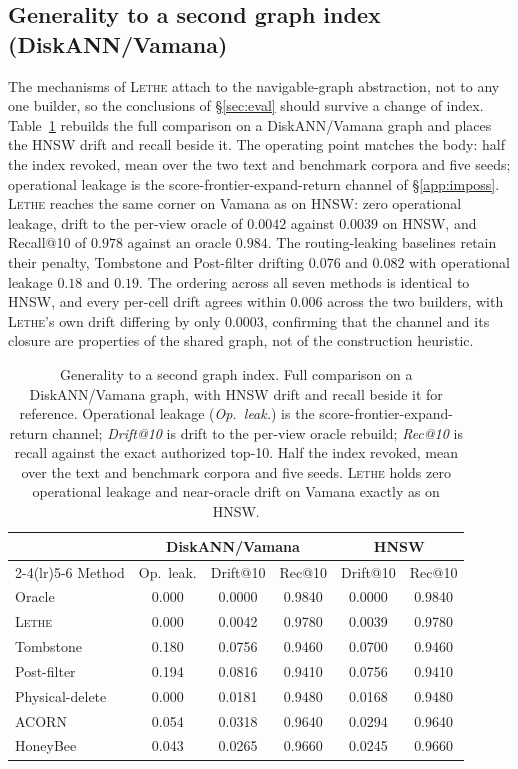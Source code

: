 \documentclass[sigconf, nonacm, review]{acmart}
\begin{document}
\subsection{Generality to a second graph index (DiskANN/Vamana)}
\label{app:diskann}
The mechanisms of \textsc{Lethe} attach to the navigable-graph abstraction, not
to any one builder, so the conclusions of \S\ref{sec:eval} should survive a
change of index. Table~\ref{tab:diskann} rebuilds the full comparison on a
DiskANN/Vamana graph and places the HNSW drift and recall beside it. The
operating point matches the body: half the index revoked, mean over the two
text and benchmark corpora and five seeds; operational leakage is the
score-frontier-expand-return channel of \S\ref{app:imposs}. \textsc{Lethe}
reaches the same corner on Vamana as on HNSW: zero operational leakage, drift to
the per-view oracle of $0.0042$ against $0.0039$ on HNSW, and Recall@10 of
$0.978$ against an oracle $0.984$. The routing-leaking baselines retain their
penalty, Tombstone and Post-filter drifting $0.076$ and $0.082$ with operational
leakage $0.18$ and $0.19$. The ordering across all seven methods is identical to
HNSW, and every per-cell drift agrees within $0.006$ across the two builders,
with \textsc{Lethe}'s own drift differing by only $0.0003$, confirming that the
channel and its closure are properties of the shared graph, not of the
construction heuristic.

\begin{table}[t]
\centering
\caption{Generality to a second graph index. Full comparison on a
DiskANN/Vamana graph, with HNSW drift and recall beside it for reference.
Operational leakage (\emph{Op.\ leak.}) is the score-frontier-expand-return
channel; \emph{Drift@10} is drift to the per-view oracle rebuild; \emph{Rec@10}
is recall against the exact authorized top-10. Half the index revoked, mean over
the text and benchmark corpora and five seeds. \textsc{Lethe} holds zero
operational leakage and near-oracle drift on Vamana exactly as on HNSW.}
\label{tab:diskann}
\small
\setlength{\tabcolsep}{4pt}
\begin{tabular}{@{}lccc cc@{}}
\toprule
& \multicolumn{3}{c}{DiskANN/Vamana} & \multicolumn{2}{c}{HNSW} \\
\cmidrule(lr){2-4}\cmidrule(lr){5-6}
Method & Op.\ leak. & Drift@10 & Rec@10 & Drift@10 & Rec@10 \\
\midrule
Oracle & 0.000 & 0.0000 & 0.9840 & 0.0000 & 0.9840 \\
\rowcolor{letherow}\textsc{Lethe} & 0.000 & 0.0042 & 0.9780 & 0.0039 & 0.9780 \\
Tombstone & 0.180 & 0.0756 & 0.9460 & 0.0700 & 0.9460 \\
Post-filter & 0.194 & 0.0816 & 0.9410 & 0.0756 & 0.9410 \\
Physical-delete & 0.000 & 0.0181 & 0.9480 & 0.0168 & 0.9480 \\
ACORN & 0.054 & 0.0318 & 0.9640 & 0.0294 & 0.9640 \\
HoneyBee & 0.043 & 0.0265 & 0.9660 & 0.0245 & 0.9660 \\
\bottomrule
\end{tabular}
\end{table}
\end{document}
